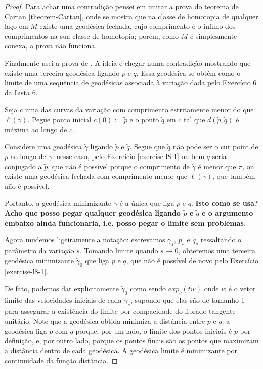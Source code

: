 \begin{proof}
Para achar uma contradição pensei em imitar a prova do teorema de Cartan
\ref{theorem-Cartan}, onde se mostra que na classe de homotopia de qualquer laço
em $M$ existe uma geodésica fechada, cujo comprimento é o ínfimo dos
comprimentos na sua classe de homotopia; porém, como $M$ é simplesmente conexa,
a prova não funciona.

Finalmente usei a prova de \cite{doc}. A ideia é chegar numa contradição
mostrando que existe uma terceira geodésica ligando $p$ e $q$. Essa geodésica se
obtém como o limite de uma sequência de geodésicas associada à variação dada
pelo Exercício 6 da Lista 6.

Seja $c$ uma das curvas da variação com comprimento estritamente
menor do que $\ell(\gamma)$. Pegue ponto inicial $c(0):=\tilde{p}$ e o ponto 
$\tilde{q}$ em $c$ tal que $d(\tilde{p},\tilde{q})$ é máxima ao longo de $c$.

Considere uma geodésica $\tilde{\gamma}$ ligando $\tilde{p}$ e $\tilde{q}$. Segue que
$\tilde{q}$ não pode ser o cut point de $\tilde{p}$ ao longo de
$\tilde{\gamma}$: nesse caso, pelo Exercício \ref{exercise-l8-1} ou bem
$\tilde{q}$ seria conjugado a $ \tilde{p}$, que não é possível porque o
comprimento de $\tilde{\gamma}$ é menor que $\pi$, ou existe uma geodésica
fechada com comprimento menor que $\ell(\gamma)$, que também não é possível.

Portanto, a geodésica minimizante $\tilde{\gamma}$ é a única que liga 
$\tilde{p}$ e $\tilde{q}$. 
{\bf Isto como se usa? Acho que posso pegar qualquer geodésica
ligando $\tilde{p}$ e $\tilde{q}$ e o argumento embaixo ainda funcionaria, i.e.
posso pegar o limite sem problemas.}

Agora mudemos ligeiramente a notação: escrevamos $\tilde{\gamma}_s$,
$\tilde{p}_s$ e $\tilde{q}_s$ ressaltando o parâmetro da variação $s$.
Tomando limite quando $s \to 0$, obteremos uma terceira geodésica minimizante 
$\tilde{\gamma}_0$ que liga $p$ e $q$, que não é possível de novo pelo
Exercício  \ref{exercise-l8-1}.

De fato, podemos dar explicitamente $\tilde{\gamma}_0$ como sendo $exp_q(tw)$
onde $w$ é o vetor limite das velocidades iniciais de cada $\tilde{\gamma}_s$,
supondo que elas são de tamanho 1 para assegurar a existência do limite por
compacidade do fibrado tangente unitário. Note que a geodésica obtida minimiza a
distância entre $p$ e $q$: a geodésica liga $p$ com  $q$ porque, por um lado, o
limite dos pontos iniciais é $p$ por definição, e, por outro lado, porque os
pontos finais são os pontos que maximizam a distância dentro de cada geodésica.
A geodésica limite é minimizante por continuidade da função distância.


\end{proof}
